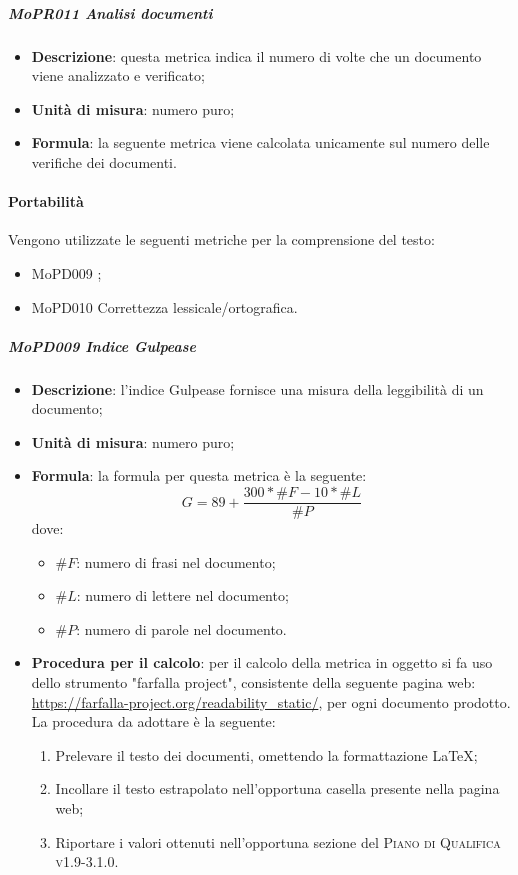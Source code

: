 \documentclass[../norme-di-progetto.tex]{subfiles}
\begin{document}
\subparagraph{MoPR011 Analisi documenti}
\begin{itemize}
  \item \textbf{Descrizione}: questa metrica indica il numero di volte che un documento viene analizzato e verificato;
  \item \textbf{Unità di misura}: numero puro;
  \item \textbf{Formula}: la seguente metrica viene calcolata unicamente sul numero delle verifiche dei documenti.
\end{itemize}

\paragraph{Portabilità}
Vengono utilizzate le seguenti metriche per la comprensione del testo:
\begin{itemize}
  \item MoPD009 ;
  \item MoPD010 Correttezza lessicale/ortografica.
\end{itemize}
\subparagraph{MoPD009 Indice Gulpease}
\begin{itemize}
  \item \textbf{Descrizione}: l'indice Gulpease fornisce una misura della leggibilità di un documento;
  \item \textbf{Unità di misura}: numero puro;
  \item \textbf{Formula}: la formula per questa metrica è la seguente:
  \begin{displaymath}
    G=89+\frac{300*\#F - 10*\#L}{\#P}
  \end{displaymath}
  dove:
  \begin{itemize}
    \item $ \#F $: numero di frasi nel documento;
    \item $ \#L $: numero di lettere nel documento;
    \item $ \#P $: numero di parole nel documento.
  \end{itemize}
  \item \textbf{Procedura per il calcolo}: per il calcolo della metrica in oggetto si fa uso dello strumento "farfalla project", consistente della seguente pagina web: \href{https://farfalla-project.org/readability_static/}{https://farfalla-project.org/readability\_static/}, per ogni documento prodotto. La procedura da adottare è la seguente:
  \begin{enumerate}
    \item Prelevare il testo dei documenti, omettendo la formattazione \LaTeX;
    \item Incollare il testo estrapolato nell'opportuna casella presente nella pagina web;
    \item Riportare i valori ottenuti nell'opportuna sezione del \textsc{Piano di Qualifica v1.9-3.1.0}.
  \end{enumerate}
\end{itemize}
\end{document}
